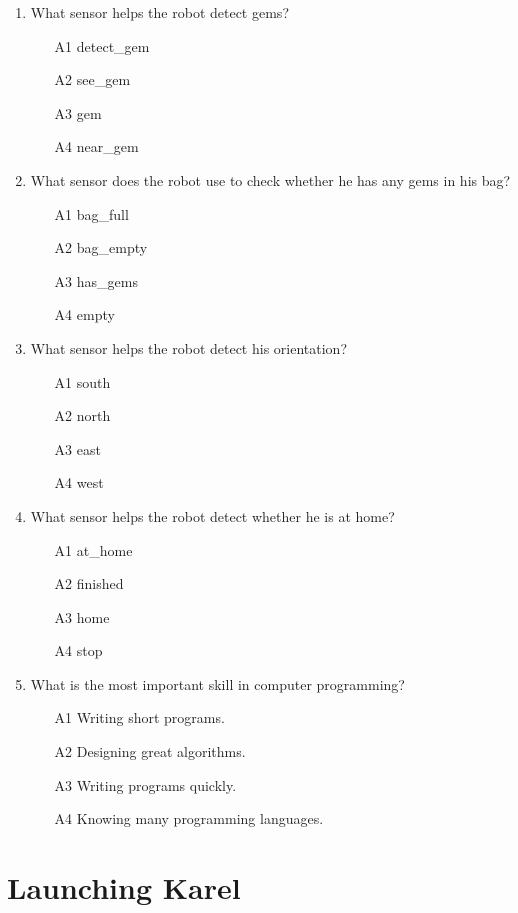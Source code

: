 \begin{enumerate}
\begin{enumerate}
\end{enumerate}
\item What sensor helps the robot detect gems?
\begin{enumerate}
\item[A1] detect\_gem
\item[A2] see\_gem
\item[A3] gem
\item[A4] near\_gem
\end{enumerate}
\item What sensor does the robot use to check whether he has any gems in his bag?
\begin{enumerate}
\item[A1] bag\_full
\item[A2] bag\_empty
\item[A3] has\_gems
\item[A4] empty
\end{enumerate}
\item What sensor helps the robot detect his orientation?
\begin{enumerate}
\item[A1] south
\item[A2] north
\item[A3] east
\item[A4] west
\end{enumerate}
\item What sensor helps the robot detect whether he is at home?
\begin{enumerate}
\item[A1] at\_home
\item[A2] finished
\item[A3] home
\item[A4] stop
\end{enumerate}
\item What is the most important skill in computer programming?
\begin{enumerate}
\item[A1] Writing short programs.
\item[A2] Designing great algorithms.
\item[A3] Writing programs quickly.
\item[A4] Knowing many programming languages.
\end{enumerate}
\end{enumerate}

\section{Launching Karel}

